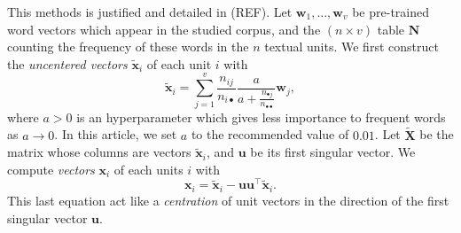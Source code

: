 \documentclass[
twocolumn,
]{ceurart}
\begin{document}
This methods is justified and detailed in (REF). Let $\mathbf{w}_1, \ldots, \mathbf{w}_v$ be pre-trained word vectors which appear in the studied corpus, and the $(n \times v)$ table $\mathbf{N}$ counting the frequency of these words in the $n$ textual units. We first construct the \emph{uncentered vectors} $\widetilde{\mathbf{x}}_i$ of each unit $i$ with
\begin{equation}
\widetilde{\mathbf{x}}_i = \sum_{j = 1}^v \frac{n_{ij}}{n_{i \bullet}} \frac{a}{a + \frac{n_{\bullet j}}{n_{\bullet \bullet}}} \mathbf{w}_j,
\end{equation}
where $a > 0$ is an hyperparameter which gives less importance to frequent words as $a \to 0$. In this article, we set $a$ to the recommended value of $0.01$. Let $\widetilde{\mathbf{X}}$ be the matrix whose columns are vectors $\widetilde{\mathbf{x}}_i$, and $\mathbf{u}$ be its first singular vector. We compute \emph{vectors} $\mathbf{x}_i$ of each units $i$ with
\begin{equation}
\mathbf{x}_i = \widetilde{\mathbf{x}}_i - \mathbf{u}\mathbf{u}^\top \widetilde{\mathbf{x}}_i.
\end{equation}
This last equation act like a \emph{centration} of unit vectors in the direction of the first singular vector $\mathbf{u}$.


\end{document}
